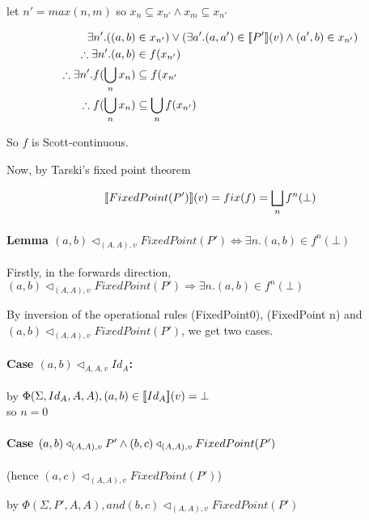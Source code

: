 \documentclass[12pt,a4paper,twoside,openright]{report}
\newcommand{\db}[1]{{\bf [\![}#1{\bf ]\!]}}
\newcommand{\deno}[1]{\db{#1}(v)}
\newcommand{\denoRule}[2]{#1 \in \deno{#2}}
\newcommand{\opRule}[3]{#1 \triangleleft_{#2, v} #3}
\newcommand{\phiRule}[3]{\Phi(\Sigma, #1, #2, #3)}
\begin{document}
{{let $n' = max(n, m)$ so $x_n \subseteq x_{n'}  \wedge x_m \subseteq x_{n'}$

\begin{equation}
\begin{split}
\exists n'. ((a,b) & \in x_{n'} ) \vee (\exists a'. \denoRule{(a, a')}{P'} \wedge (a', b) \in x_{n'})\\
\therefore\exists n'. (a, b) &\in f(x_{n'})\\
\therefore\exists n'. f(\bigcup_nx_n) &\subseteq f(x_{n'}\\
\therefore f(\bigcup_nx_n) &\subseteq \bigcup_nf(x_{n'})\\
\end{split}
\end{equation}


\setlength{\leftskip}{0pt}
So $f$ is Scott-continuous.

Now, by Tarski's fixed point theorem

$$\deno{FixedPoint(P')} = fix(f) = \bigsqcup_nf^n(\bot)$$


\paragraph{Lemma $\opRule{(a, b)}{(A, A)}{FixedPoint(P')} \Leftrightarrow \exists n. (a, b) \in f^n(\bot)$}

Firstly, in the forwards direction, $\opRule{(a, b)}{(A, A)}{FixedPoint(P')} \Rightarrow \exists n. (a, b) \in f^n(\bot)$

By inversion of the operational rules (FixedPoint0), (FixedPoint n) and $\opRule{(a, b)}{(A, A)}{FixedPoint(P')}$, we get two cases.



\paragraph{Case $\opRule{(a,b)}{A, A}{Id_A}$:\\}
by $\phiRule{Id_A}{A}{A}, \denoRule{(a, b)}{Id_A} = \bot$\\so $n = 0$


\paragraph{Case $\opRule{(a, b)}{(A,A)}{P'} \wedge \opRule{(b, c)}{(A,A)}{FixedPoint(P')}\\ $}
(hence $\opRule{(a, c)}{(A, A)}{FixedPoint(P')}$)

by $\phiRule{P'}{A}{A}, and \opRule{(b,c)}{(A,A)}{FixedPoint(P')}$

}}
\end{document}

